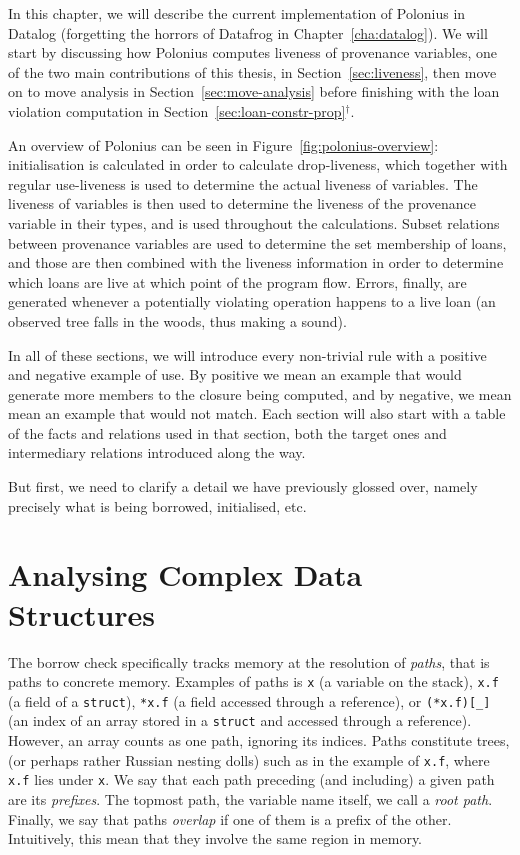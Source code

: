 \documentclass[11pt,a4paper,twoside,openany]{report}
\newcommand{\notmine}[0] {$^\dagger$}
\newcommand{\InRust}[1]{\texttt{#1}}
\renewcommand\_{\textunderscore\allowbreak}
\begin{document}
In this chapter, we will describe the current implementation of Polonius in
Datalog (forgetting the horrors of Datafrog in Chapter~\ref{cha:datalog}). We
will start by discussing how Polonius computes liveness of provenance variables,
one of the two main contributions of this thesis, in Section~\ref{sec:liveness},
then move on to move analysis in Section~\ref{sec:move-analysis} before
finishing with the loan violation computation in
Section~\ref{sec:loan-constr-prop}\notmine{}.

An overview of Polonius can be seen in Figure~\ref{fig:polonius-overview}:
initialisation is calculated in order to calculate drop-liveness, which together
with regular use-liveness is used to determine the actual liveness of variables.
The liveness of variables is then used to determine the liveness of the
provenance variable in their types, and is used throughout the calculations.
Subset relations between provenance variables are used to determine the set
membership of loans, and those are then combined with the liveness information
in order to determine which loans are live at which point of the program flow.
Errors, finally, are generated whenever a potentially violating operation
happens to a live loan (an observed tree falls in the woods, thus making a
sound).

In all of these sections, we will introduce every non-trivial rule with a
positive and negative example of use. By positive we mean an example that would
generate more members to the closure being computed, and by negative, we mean
mean an example that would not match. Each section will also start with a table
of the facts and relations used in that section, both the target ones and
intermediary relations introduced along the way.

But first, we need to clarify a detail we have previously glossed over, namely
precisely what is being borrowed, initialised, etc.

\section{Analysing Complex Data Structures}\label{sec:paths}

The borrow check specifically tracks memory at the resolution of \textit{paths},
that is paths to concrete memory. Examples of paths is \InRust{x} (a variable on
the stack), \InRust{x.f} (a field of a \InRust{struct}), \InRust{*x.f} (a field
accessed through a reference), or \InRust{(*x.f)[_]} (an index of an array
stored in a \InRust{struct} and accessed through a reference). However, an array
counts as one path, ignoring its indices. Paths constitute trees, (or perhaps
rather Russian nesting dolls) such as in the example of \InRust{x.f}, where
\InRust{x.f} lies under \InRust{x}. We say that each path preceding (and
including) a given path are its \textit{prefixes}. The topmost path, the
variable name itself, we call a \textit{root path}. Finally, we say that paths
\textit{overlap} if one of them is a prefix of the other. Intuitively, this mean
that they involve the same region in memory.
\end{document}
